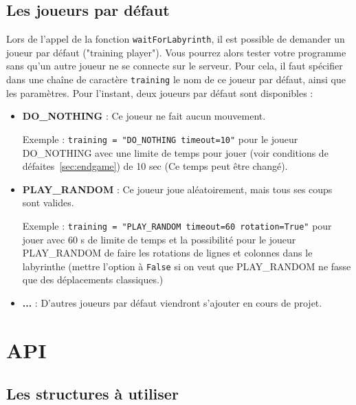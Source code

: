 \documentclass[french,12pt,a4paper,twoside,openright,titlepage]{report}
\begin{document}
\subsection{Les joueurs par défaut}
\label{sec:default}
Lors de l'appel de la fonction \verb|waitForLabyrinth|, il est possible de demander un joueur par défaut  ("training player").
Vous pourrez alors tester votre programme sans qu'un autre joueur ne se connecte sur le serveur.
Pour cela, il faut spécifier dans une chaîne de caractère \verb|training|  le nom de ce joueur par défaut, ainsi que les paramètres. Pour l'instant, deux joueurs par défaut sont disponibles : 
\begin{itemize}
\item \textbf{DO\_NOTHING} : Ce joueur ne fait aucun mouvement.

Exemple : \verb|training = "DO_NOTHING timeout=10"| pour le joueur DO\_NOTHING avec une limite de temps pour jouer (voir conditions de défaites~\ref{sec:endgame}) de 10 sec (Ce temps peut être changé).

\item \textbf{PLAY\_RANDOM} : Ce joueur joue aléatoirement, mais tous ses coups sont valides.

Exemple : \verb|training = "PLAY_RANDOM timeout=60 rotation=True"| pour jouer avec 60 s de limite de temps et la possibilité pour le joueur PLAY\_RANDOM de faire les rotations de lignes et colonnes dans le labyrinthe (mettre l'option à \verb|False| si on veut que PLAY\_RANDOM ne fasse que des déplacements classiques.)

\item \textbf{...} : D'autres joueurs par défaut viendront s'ajouter en cours de projet.

\end{itemize}

\section{\label{sec:api}API}


\subsection{Les structures à utiliser}
\end{document}
